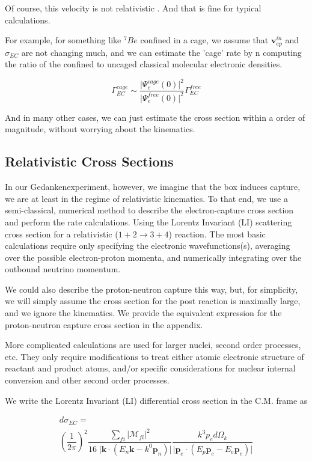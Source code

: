 \documentclass[%
 aip,
 jmp,%
 amsmath,amssymb,
 reprint,%
]{revtex4-1}
\begin{document}
Of course, this velocity is not relativistic \cite{Cannoni}.  And that is fine for typical calculations.

For example, for something like  $^7Be$ confined in a cage, we assume that $\mathbf{v}^{in}_{ep}$ and $\sigma_{EC}$ are not changing much, and we can estimate the 'cage' rate by n computing the ratio of the confined to uncaged classical molecular electronic densities. 

$$\Gamma^{cage}_{EC}\sim\dfrac{\vert\Psi^{cage}_{e}(0)\vert^{2}}{\vert\Psi^{free}_{e}(0)\vert^{2}}\Gamma^{free}_{EC}$$

And in many other cases, we can just estimate the cross section within a order of magnitude, without worrying about the kinematics.

\subsection{Relativistic Cross Sections}

In our Gedankenexperiment, however, we imagine that the box induces capture, we are at least in the regime of relativistic kinematics.  To that end,
we use a semi-classical, numerical method to describe the electron-capture cross section and perform the rate calculations. Using the Lorentz Invariant (LI) scattering cross section for a relativistic ($1+2\rightarrow 3+4$) reaction.  The most basic calculations require only specifying the electronic wavefunctions(s), averaging over the possible electron-proton momenta, and numerically integrating over the outbound neutrino momentum.    

We could also describe the proton-neutron capture this way, but, for simplicity, we will simply assume the cross section for the post reaction is maximally large, and we ignore the kinematics.  We provide the equivalent expression for the proton-neutron capture cross section in the appendix.

More complicated calculations are used for larger nuclei, second order processes, etc.  They only require modifications to treat either atomic electronic structure of reactant and product atoms, and/or specific considerations for nuclear internal conversion and other second order processes.

We write the Lorentz Invariant (LI) differential cross section in the C.M. frame as

\begin{multline}
d\sigma_{EC}=
\\\left(\dfrac{1}{2\pi}\right)^{2}\dfrac{\sum_{fi}\big\vert\mathcal{M}_{fi}\big\vert^{2}}{16\;\big\vert\mathbf{k}\cdot(E{_n}\mathbf{k}-k^{0}\mathbf{p}_{n})\big\vert}\dfrac{k^{3}p_{e}d\Omega_{k}}{\big\vert\mathbf{p}_{e}\cdot(E_{p}\mathbf{p}_{e}-E_{e}\mathbf{p}_{e})\big\vert}
\end{multline}
\end{document}
